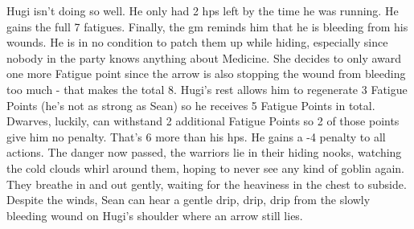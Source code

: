 \begin{exampletext}
Hugi isn't doing so well. He only had 2 \glspl{hp} left by the time he was running.
He gains the full 7 \glspl{fatigue}.
Finally, the \gls{gm} reminds him that he is bleeding from his wounds.
He is in no condition to patch them up while hiding, especially since nobody in the party knows anything about Medicine.
She decides to only award one more Fatigue point since the arrow is also stopping the wound from bleeding too much - that makes the total 8.
Hugi's rest allows him to regenerate 3 Fatigue Points (he's not as strong as Sean) so he receives 5 Fatigue Points in total.
Dwarves, luckily, can withstand 2 additional Fatigue Points so 2 of those points give him no penalty.
That's 6 more than his \glspl{hp}.
He gains a -4 penalty to all actions.
The danger now passed, the warriors lie in their hiding nooks, watching the cold clouds whirl around them, hoping to never see any kind of goblin again.
They breathe in and out gently, waiting for the heaviness in the chest to subside.
Despite the winds, Sean can hear a gentle drip, drip, drip from the slowly bleeding wound on Hugi's shoulder where an arrow still lies.

\end{exampletext}

